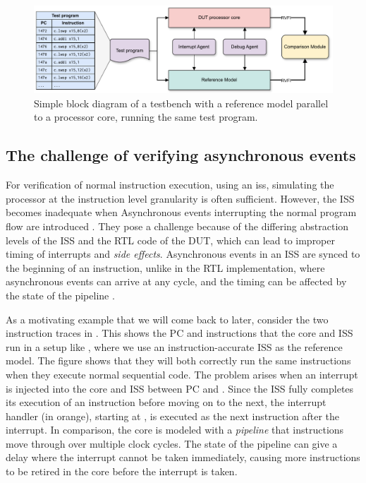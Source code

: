\begin{figure}
    \centering
    \includegraphics[width=1.00\linewidth]{figures/ISS_Testbench.pdf}
    \caption{Simple block diagram of a testbench with a reference model parallel to a processor core, running the same test program. }
    \label{fig:testbench_block_diagram}
\end{figure}


\subsection{The challenge of verifying asynchronous events}

For verification of normal instruction execution, using an \acrfull{iss}, simulating the processor at the instruction level granularity is often sufficient. However, the ISS becomes inadequate when Asynchronous events interrupting the normal program flow are introduced \cite{taylorAdvancedRISCVVerification2023}. They pose a challenge because of the differing abstraction levels of the ISS and the RTL code of the DUT, which can lead to improper timing of interrupts and \textit{side effects}. Asynchronous events in an ISS are synced to the beginning of an instruction, unlike in the RTL implementation, where asynchronous events can arrive at any cycle, and the timing can be affected by the state of the pipeline \cite{taylorAdvancedRISCVVerification2023}.

As a motivating example that we will come back to later, consider the two instruction traces in . This shows the PC and instructions that the core and ISS run in a setup like , where we use an instruction-accurate ISS as the reference model. The figure shows that they will both correctly run the same instructions when they execute normal sequential code. The problem arises when an interrupt is injected into the core and ISS between PC  and . Since the ISS fully completes its execution of an instruction before moving on to the next, the interrupt handler (in orange), starting at , is executed as the next instruction after the interrupt. In comparison, the core is modeled with a \textit{pipeline} that instructions move through over multiple clock cycles. The state of the pipeline can give a delay where the interrupt cannot be taken immediately, causing more instructions to be retired in the core before the interrupt is taken. 

